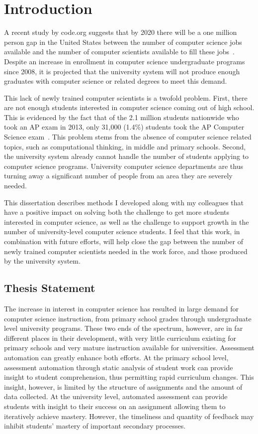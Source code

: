 \chapter{Introduction} \label{chap:introduction}
A recent study by code.org suggests that by 2020 there will be a one million
person gap in the United States between the number of computer science jobs
available and the number of computer scientists available to fill these
jobs~\cite{codeorg:2013}. Despite an increase in enrollment in computer science
undergraduate programs since 2008, it is projected that the university system
will not produce enough graduates with computer science or related degrees to
meet this demand.

This lack of newly trained computer scientists is a twofold problem. First,
there are not enough students interested in computer science coming out of high
school. This is evidenced by the fact that of the 2.1 million students
nationwide who took an AP exam in 2013, only 31,000 (1.4\%) students took the
AP Computer Science exam~\cite{cb:2013}. This problem stems from the absence of
computer science related topics, such as computational thinking, in middle and
primary schools. Second, the university system already cannot handle the number
of students applying to computer science programs. University computer science
departments are thus turning away a significant number of people from an area
they are severely needed.

This dissertation describes methods I developed along with my colleagues that
have a positive impact on solving both the challenge to get more students
interested in computer science, as well as the challenge to support growth in
the number of university-level computer science students. I feel that this
work, in combination with future efforts, will help close the gap between the
number of newly trained computer scientists needed in the work force, and those
produced by the university system.

\section{Thesis Statement}
The increase in interest in computer science has resulted in large demand for
computer science instruction, from primary school grades through undergraduate
level university programs. These two ends of the spectrum, however, are in far
different places in their development, with very little curriculum existing for
primary schools and very mature instruction available for
universities. Assessment automation can greatly enhance both efforts. At the
primary school level, assessment automation through static analysis of student
work can provide insight to student comprehension, thus permitting rapid
curriculum changes. This insight, however, is limited by the structure of
assignments and the amount of data collected. At the university level,
automated assessment can provide students with insight to their success on an
assignment allowing them to iteratively achieve mastery. However, the
timeliness and quantity of feedback may inhibit students' mastery of important
secondary processes.

